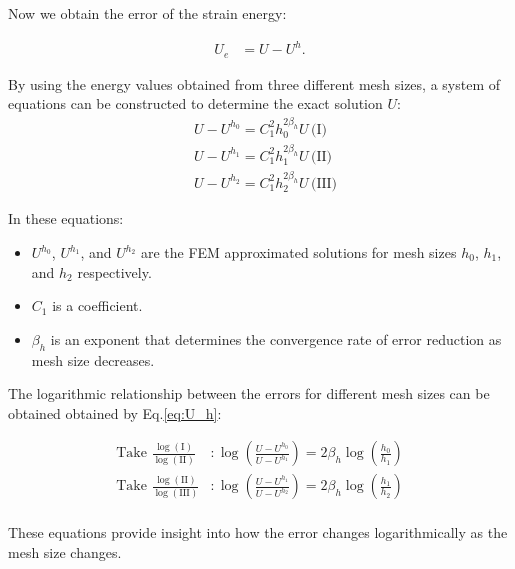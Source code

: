 \documentclass[twoside,twocolumn,10pt]{article}
\begin{document}
Now we obtain the error of the strain energy:

\begin{equation}
  \begin{aligned}
U_e &= U - U^h.
\end{aligned}
\end{equation}

By using the energy values obtained from three different mesh sizes, a system of equations can be constructed to determine the exact solution 
$U$:
\begin{equation}
\begin{aligned}
  & U-U^{h_0}=C_1^2 h_0^{2 \beta_h} U \, \text{(I)}\\
  & U-U^{h_1}=C_1^2 h_1^{2 \beta_h} U \, \text{(II)}\\
  & U-U^{h_2}=C_1^2 h_2^{2 \beta_h} U \, \text{(III)}
\end{aligned}
\label{eq:U_h}
\end{equation}

In these equations:
\begin{itemize}
    \item \( U^{h_0} \), \( U^{h_1} \), and \( U^{h_2} \) are the FEM approximated solutions for mesh sizes \( h_0 \), \( h_1 \), and \( h_2 \) respectively.
    \item \( C_1 \) is a coefficient.
    \item \( \beta_h\) is an exponent that determines the convergence rate of error reduction as mesh size decreases.
\end{itemize}

The logarithmic relationship between the errors for different mesh sizes can be obtained obtained by Eq.\ref{eq:U_h}:

\begin{equation}
\begin{aligned}
  \text{Take } \frac{\log(\text{I})}{\log(\text{II})} & : \log \left( \frac{U-U^{h_0}}{U-U^{h_1}} \right) = 2 \beta_h \log \left(\frac{h_0}{h_1}\right) \\
  \text{Take } \frac{\log(\text{II})}{\log(\text{III})} & : \log \left( \frac{U-U^{h_1}}{U-U^{h_2}} \right) = 2 \beta_h \log \left(\frac{h_1}{h_2}\right) \\
\end{aligned}
\label{eq:logU_h} 
\end{equation}

These equations provide insight into how the error changes logarithmically as the mesh size changes.
\end{document}
